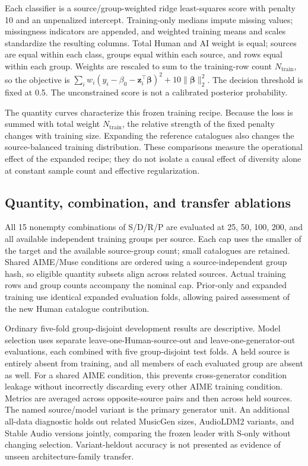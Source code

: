 Each classifier is a source/group-weighted ridge least-squares score with penalty
10 and an unpenalized intercept. Training-only medians impute missing values;
missingness indicators are appended, and weighted training means and scales
standardize the resulting columns. Total Human and AI weight is equal; sources
are equal within each class, groups equal within each source, and rows equal
within each group. Weights are rescaled to sum to the training-row count
$N_{\mathrm{train}}$, so the objective is
$\sum_i w_i(y_i-\beta_0-\mathbf{z}_i^\top\boldsymbol{\beta})^2
+10\lVert\boldsymbol{\beta}\rVert_2^2$.
The decision threshold is fixed at 0.5. The unconstrained score is not a
calibrated posterior probability.

The quantity curves characterize this frozen training recipe. Because the loss
is summed with total weight $N_{\mathrm{train}}$, the relative strength of the
fixed penalty changes with training size. Expanding the reference catalogues also
changes the source-balanced training distribution. These comparisons measure the
operational effect of the expanded recipe; they do not isolate a causal effect
of diversity alone at constant sample count and effective regularization.

\subsection{Quantity, combination, and transfer ablations}

All 15 nonempty combinations of S/D/R/P are evaluated at 25, 50, 100, 200, and all
available independent training groups per source. Each cap uses the smaller of
the target and the available source-group count; small catalogues are retained.
Shared AIME/Muse conditions are ordered using a source-independent group hash,
so eligible quantity subsets align across related sources. Actual training rows
and group counts accompany the nominal cap. Prior-only and
expanded training use identical expanded evaluation folds, allowing paired
assessment of the new Human catalogue contribution.

Ordinary five-fold group-disjoint development results are descriptive. Model
selection uses separate leave-one-Human-source-out and leave-one-generator-out
evaluations, each combined with five group-disjoint test folds. A held source is
entirely absent from training, and all members of each evaluated group are absent
as well. For a shared AIME condition, this prevents cross-generator condition
leakage without incorrectly discarding every other AIME training condition.
Metrics are averaged across opposite-source pairs and then across held sources.
The named source/model variant is the primary generator unit. An additional
all-data diagnostic holds out related MusicGen sizes, AudioLDM2 variants, and
Stable Audio versions jointly, comparing the frozen leader with S-only without
changing selection. Variant-heldout accuracy is not presented as evidence of
unseen architecture-family transfer.


